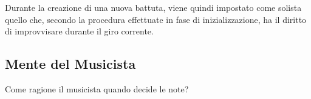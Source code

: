 Durante la creazione di una nuova battuta, viene quindi impostato come solista quello che, secondo la procedura effettuate in fase di inizializzazione, ha il diritto di improvvisare durante il giro corrente.


\subsection{Mente del Musicista}
Come ragione il musicista quando decide le note?
